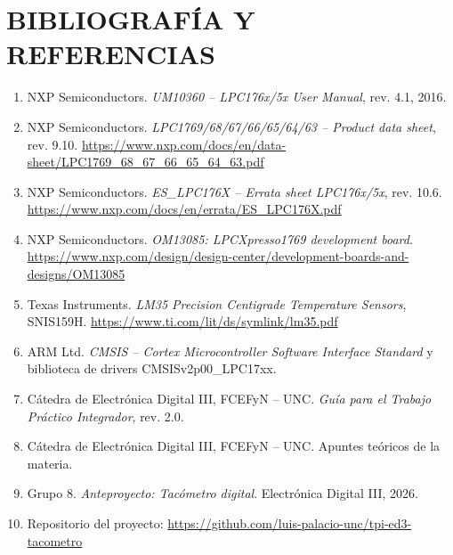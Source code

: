 \section{BIBLIOGRAFÍA Y REFERENCIAS}

\begin{enumerate}
  \item NXP Semiconductors. \textit{UM10360 -- LPC176x/5x User Manual}, rev. 4.1, 2016.
  \item NXP Semiconductors. \textit{LPC1769/68/67/66/65/64/63 -- Product data sheet},
  rev. 9.10. \url{https://www.nxp.com/docs/en/data-sheet/LPC1769_68_67_66_65_64_63.pdf}
  \item NXP Semiconductors. \textit{ES\_LPC176X -- Errata sheet LPC176x/5x}, rev. 10.6.
  \url{https://www.nxp.com/docs/en/errata/ES_LPC176X.pdf}
  \item NXP Semiconductors. \textit{OM13085: LPCXpresso1769 development board}.
  \url{https://www.nxp.com/design/design-center/development-boards-and-designs/OM13085}
  \item Texas Instruments. \textit{LM35 Precision Centigrade Temperature Sensors}, SNIS159H.
  \url{https://www.ti.com/lit/ds/symlink/lm35.pdf}
  \item ARM Ltd. \textit{CMSIS -- Cortex Microcontroller Software Interface Standard} y
  biblioteca de drivers CMSISv2p00\_LPC17xx.
  \item Cátedra de Electrónica Digital III, FCEFyN -- UNC. \textit{Guía para el Trabajo
  Práctico Integrador}, rev. 2.0.
  \item Cátedra de Electrónica Digital III, FCEFyN -- UNC. Apuntes teóricos de la materia.
  \item Grupo 8. \textit{Anteproyecto: Tacómetro digital}. Electrónica Digital III, 2026.
  \item Repositorio del proyecto:
  \url{https://github.com/luis-palacio-unc/tpi-ed3-tacometro}
\end{enumerate}
